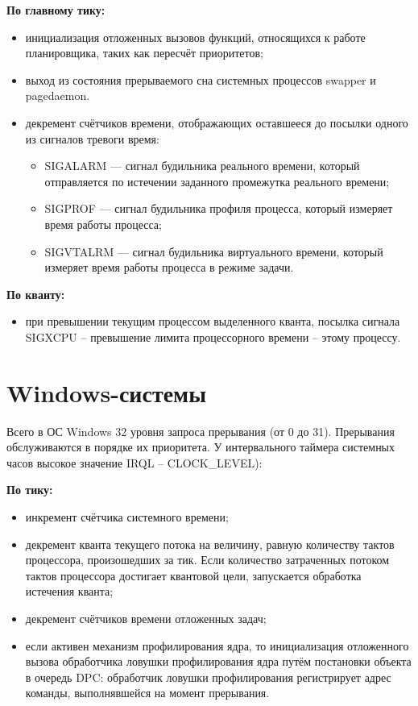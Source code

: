 \textbf{По главному тику:}
\begin{itemize}
	\item инициализация отложенных вызовов функций, относящихся к работе планировщика, таких как пересчёт приоритетов;
	\item выход из состояния прерываемого сна системных процессов {\ttfamily swapper} и {\ttfamily pagedaemon}.
	\item декремент счётчиков времени, отображающих оставшееся до посылки одного из сигналов тревоги время:
	\begin{itemize}
		\item {\ttfamily SIGALARM} --- сигнал будильника реального времени, который отправляется по истечении заданного промежутка реального времени;
		\item {\ttfamily SIGPROF} --- сигнал будильника профиля процесса, который измеряет время работы процесса;
		\item {\ttfamily SIGVTALRM} --- сигнал будильника виртуального времени, который измеряет время работы процесса в режиме задачи.
	\end{itemize}
\end{itemize}

\textbf{По кванту:}
\begin{itemize}
	\item при превышении текущим процессом выделенного кванта, посылка сигнала {\ttfamily SIGXCPU} -- превышение лимита процессорного времени -- этому процессу.
\end{itemize}

\section{Windows-системы}

Всего в ОС Windows 32 уровня запроса прерывания (от 0 до 31). Прерывания обслуживаются в порядке их приоритета. У интервального таймера системных часов высокое значение {\ttfamily IRQL} – {\ttfamily CLOCK\_LEVEL}):

\textbf{По тику:}
\begin{itemize}
	\item инкремент счётчика системного времени;
	\item декремент кванта текущего потока на величину, равную количеству тактов процессора, произошедших за тик. Если количество затраченных потоком тактов процессора достигает квантовой цели, запускается обработка истечения кванта;
	\item декремент счётчиков времени отложенных задач;
	\item если активен механизм профилирования ядра, то инициализация отложенного вызова обработчика ловушки профилирования ядра путём постановки объекта в очередь {\ttfamily DPC}: обработчик ловушки профилирования регистрирует адрес команды, выполнявшейся на момент прерывания. 
\end{itemize}

